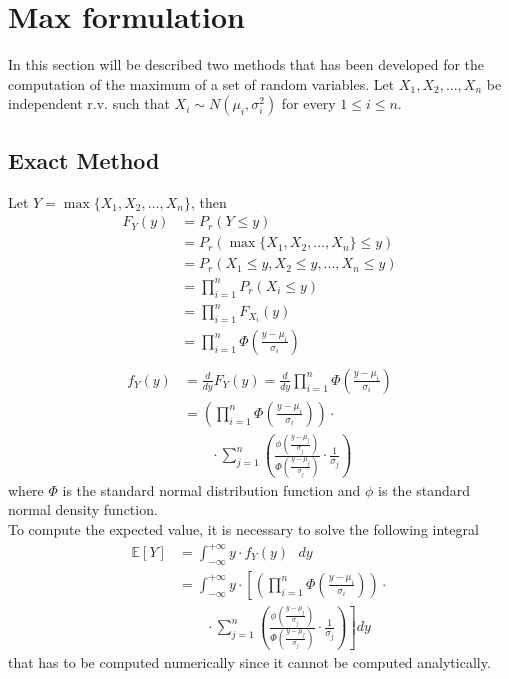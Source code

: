\section{Max formulation}\label{max_formulation}

In this section will be described two methods that has been developed for the computation of the maximum of a set of random variables.
Let $X_1, X_2, ..., X_n$ be independent r.v. such that $X_i \sim N(\mu_i, \sigma_i^2)$ for every $1 \leq i \leq n.$

\subsection{Exact Method}
Let $Y = \max\{X_1, X_2, ..., X_n\}$, then
\begin{align*}
	F_Y(y) &= P_r(Y \leq y) \\
	&= P_r(\max\{X_1, X_2, ..., X_n\} \leq y) \\
	&= P_r(X_1 \leq y, X_2 \leq y, ..., X_n \leq y) \\
	&= \prod_{i = 1}^n P_r(X_i \leq y)  \tag*{(by indipendence of r.v)} \\
	&= \prod_{i = 1}^n F_{X_i}(y)  \\
	&= \prod_{i = 1}^n \Phi\left(\frac{y - \mu_i}{\sigma_i}\right) \\
\end{align*}
\begin{align*}
	f_Y(y) &= \frac{d}{dy} F_Y(y) = \frac{d}{dy} \prod_{i = 1}^n \Phi\left(\frac{y - \mu_i}{\sigma_i}\right) \\
	&= \left(\prod_{i = 1}^n \Phi\left(\frac{y - \mu_i}{\sigma_i}\right)\right) \cdot \\
	&\qquad \cdot \sum_{j = 1}^n \left(\frac{\phi\left(\frac{y - \mu_j}{\sigma_j}\right)}{\Phi\left(\frac{y - \mu_j}{\sigma_j}\right)} \cdot \frac{1}{\sigma_j}\right)
\end{align*}
where $\Phi$ is the standard normal distribution function and $\phi$ is the standard normal density function. \\
To compute the expected value, it is necessary to solve the following integral
\begin{align*}
	\mathbb{E}[Y] &= \int_{-\infty}^{+\infty} y \cdot f_Y(y)\text{ }dy \\
	&= \int_{-\infty}^{+\infty} y \cdot \left[\left(\prod_{i = 1}^n \Phi\left(\frac{y - \mu_i}{\sigma_i}\right)\right) \cdot \right. \\
	&\left. \qquad \cdot \sum_{j = 1}^n \left(\frac{\phi\left(\frac{y - \mu_j}{\sigma_j}\right)}{\Phi\left(\frac{y - \mu_j}{\sigma_j}\right)} \cdot \frac{1}{\sigma_j}\right)\right]dy
\end{align*}
that has to be computed numerically since it cannot be computed analytically.

